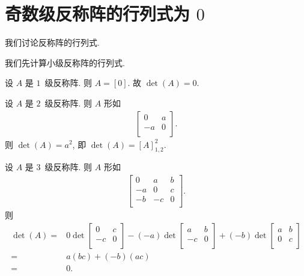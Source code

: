 \section{\texorpdfstring{奇数级反称阵的行列式为 \(0\)}
  {奇数级反称阵的行列式为 0}}

我们讨论反称阵的行列式.

我们先计算小级反称阵的行列式.

\begin{example}
    设 \(A\) 是 \(1\)~级反称阵.
    则 \(A = [0]\).
    故 \(\det {(A)} = 0\).
\end{example}

\begin{example}
    设 \(A\) 是 \(2\)~级反称阵.
    则 \(A\) 形如
    \begin{align*}
        \begin{bmatrix}
            0  & a \\
            -a & 0 \\
        \end{bmatrix}.
    \end{align*}
    则 \(\det {(A)} = a^2\),
    即 \(\det {(A)} = [A]_{1,2}^2\).
\end{example}

\begin{example}
    设 \(A\) 是 \(3\)~级反称阵.
    则 \(A\) 形如
    \begin{align*}
        \begin{bmatrix}
            0  & a  & b \\
            -a & 0  & c \\
            -b & -c & 0 \\
        \end{bmatrix}.
    \end{align*}
    则
    \begin{align*}
        \det {(A)}
        = {} &
        0
        \det {\begin{bmatrix}
                      0  & c \\
                      -c & 0 \\
                  \end{bmatrix}}
        - (-a)
        \det {\begin{bmatrix}
                      a  & b \\
                      -c & 0 \\
                  \end{bmatrix}}
        + (-b)
        \det {\begin{bmatrix}
                      a & b \\
                      0 & c \\
                  \end{bmatrix}}
        \\
        = {} &
        a(bc) + (-b)(ac)
        \\
        = {} & 0.
    \end{align*}
\end{example}


